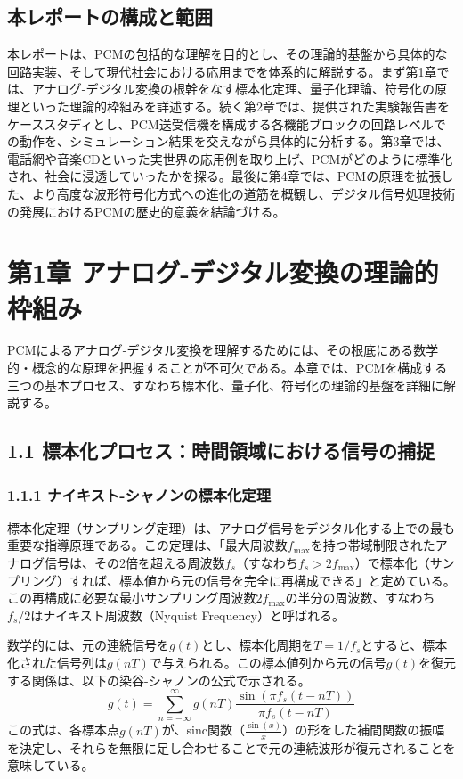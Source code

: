 \documentclass[
  a4paper,  %
  11pt,     %
]{ltjsarticle}%
\begin{document}
\subsection{本レポートの構成と範囲}

本レポートは、PCMの包括的な理解を目的とし、その理論的基盤から具体的な回路実装、そして現代社会における応用までを体系的に解説する。まず第1章では、アナログ-デジタル変換の根幹をなす標本化定理、量子化理論、符号化の原理といった理論的枠組みを詳述する。続く第2章では、提供された実験報告書をケーススタディとし、PCM送受信機を構成する各機能ブロックの回路レベルでの動作を、シミュレーション結果を交えながら具体的に分析する。第3章では、電話網や音楽CDといった実世界の応用例を取り上げ、PCMがどのように標準化され、社会に浸透していったかを探る。最後に第4章では、PCMの原理を拡張した、より高度な波形符号化方式への進化の道筋を概観し、デジタル信号処理技術の発展におけるPCMの歴史的意義を結論づける。

\section{第1章 アナログ-デジタル変換の理論的枠組み}

PCMによるアナログ-デジタル変換を理解するためには、その根底にある数学的・概念的な原理を把握することが不可欠である。本章では、PCMを構成する三つの基本プロセス、すなわち標本化、量子化、符号化の理論的基盤を詳細に解説する。

\subsection{1.1 標本化プロセス：時間領域における信号の捕捉}

\subsubsection{1.1.1 ナイキスト-シャノンの標本化定理}

標本化定理（サンプリング定理）は、アナログ信号をデジタル化する上での最も重要な指導原理である。この定理は、「最大周波数$f_{\text{max}}$を持つ帯域制限されたアナログ信号は、その2倍を超える周波数$f_s$（すなわち$f_s > 2f_{\text{max}}$）で標本化（サンプリング）すれば、標本値から元の信号を完全に再構成できる」と定めている\cite{ref1}。この再構成に必要な最小サンプリング周波数$2f_{\text{max}}$の半分の周波数、すなわち$f_s/2$はナイキスト周波数（Nyquist Frequency）と呼ばれる\cite{ref5}。

数学的には、元の連続信号を$g(t)$とし、標本化周期を$T=1/f_s$とすると、標本化された信号列は$g(nT)$で与えられる。この標本値列から元の信号$g(t)$を復元する関係は、以下の染谷-シャノンの公式で示される\cite{ref1}。
\begin{equation}
  g(t) = \sum_{n=-\infty}^{\infty} g(nT) \frac{\sin(\pi f_s(t-nT))}{\pi f_s(t-nT)}
\end{equation}
この式は、各標本点$g(nT)$が、sinc関数（$\frac{\sin(x)}{x}$）の形をした補間関数の振幅を決定し、それらを無限に足し合わせることで元の連続波形が復元されることを意味している\cite{ref1}。
\end{document}
